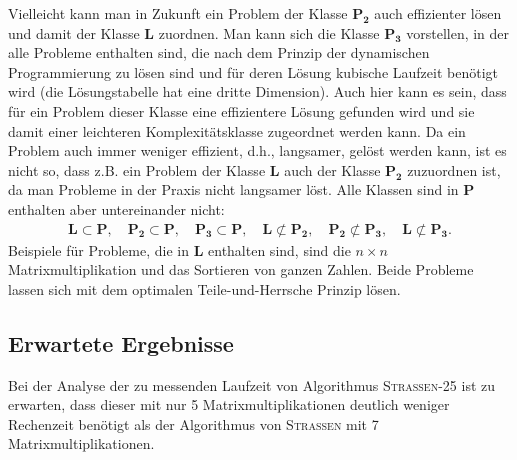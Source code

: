 \documentclass{scrartcl}
\numberwithin{equation}{section}
\begin{document}
Vielleicht kann man in Zukunft ein Problem der Klasse $\mathbf{P_2}$ auch effizienter lösen und damit der Klasse $\mathbf{L}$ zuordnen. Man kann sich die Klasse $\mathbf{P_3}$ vorstellen, in der alle Probleme enthalten sind, die nach dem Prinzip der dynamischen Programmierung zu lösen sind und für deren Lösung kubische Laufzeit benötigt wird (die Lösungstabelle hat eine dritte Dimension). Auch hier kann es sein, dass für ein Problem dieser Klasse eine effizientere Lösung gefunden wird und sie damit einer leichteren Komplexitätsklasse zugeordnet werden kann. Da ein Problem auch immer weniger effizient, d.h., langsamer, gelöst werden kann, ist es nicht so, dass z.B. ein Problem der Klasse $\mathbf{L}$ auch der Klasse $\mathbf{P_2}$ zuzuordnen ist, da man Probleme in der Praxis nicht langsamer löst. Alle Klassen sind in $\mathbf{P}$ enthalten aber untereinander nicht:
\begin{align*}
	\mathbf{L} \subset \mathbf{P}, \quad \mathbf{P_2} \subset \mathbf{P}, \quad \mathbf{P_3} \subset \mathbf{P}, \quad \mathbf{L} \not \subset \mathbf{P_2}, \quad \mathbf{P_2} \not \subset \mathbf{P_3}, \quad \mathbf{L} \not \subset \mathbf{P_3}.
\end{align*}
Beispiele für Probleme, die in $\mathbf{L}$ enthalten sind, sind die $n \times n$ Matrixmultiplikation und das Sortieren von ganzen Zahlen. Beide Probleme lassen sich mit dem optimalen Teile-und-Herrsche Prinzip lösen.

\subsection{Erwartete Ergebnisse}
Bei der Analyse der zu messenden Laufzeit von Algorithmus \textsc{Strassen-25} ist zu erwarten, dass dieser mit nur 5 Matrixmultiplikationen deutlich weniger Rechenzeit benötigt als der Algorithmus von \textsc{Strassen} mit 7 Matrixmultiplikationen.
\end{document}
